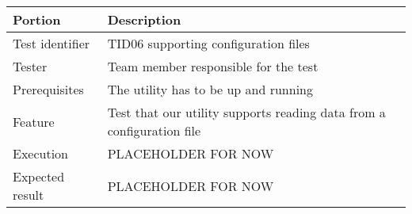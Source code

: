 \documentclass[a4paper, 11pt]{report}
\begin{document}
\begin{table}[H]
\begin{tabularx}{\textwidth}{l X}
\hline\hline
Portion & Description\\[0.5ex]
\hline
Test identifier & TID06 supporting configuration files\\[0.5ex]
Tester & Team member responsible for the test\\[0.5ex]
Prerequisites & The utility has to be up and running\\[0.5ex]
Feature & Test that our utility supports reading data from a configuration file \\[0.5ex]
Execution & PLACEHOLDER FOR NOW\\[0.5ex]
Expected result & PLACEHOLDER FOR NOW\\[0.5ex]
\hline\hline
\end{tabularx}




\end{table}
\end{document}
